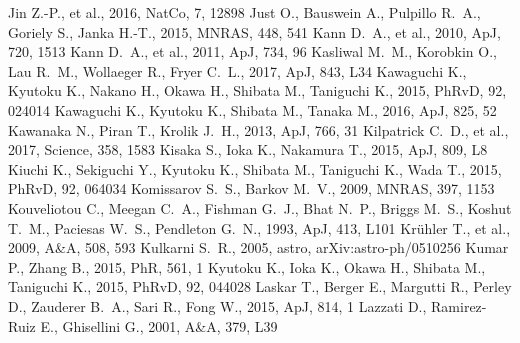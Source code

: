 \documentclass[a4paper,fleqn,usenatbib]{mnras}
\begin{document}
\begin{thebibliography}{207}
 Jin Z.-P., et al., 2016, NatCo, 7, 12898
 Just O., Bauswein A., Pulpillo R.~A., Goriely S., Janka H.-T., 2015, MNRAS, 448, 541
 Kann D.~A., et al., 2010, ApJ, 720, 1513
 Kann D.~A., et al., 2011, ApJ, 734, 96
 Kasliwal M.~M., Korobkin O., Lau R.~M., Wollaeger R., Fryer C.~L., 2017, ApJ, 843, L34
 Kawaguchi K., Kyutoku K., Nakano H., Okawa H., Shibata M., Taniguchi K., 2015, PhRvD, 92, 024014
 Kawaguchi K., Kyutoku K., Shibata M., Tanaka M., 2016, ApJ, 825, 52
 Kawanaka N., Piran T., Krolik J.~H., 2013, ApJ, 766, 31
 Kilpatrick C.~D., et al., 2017, Science, 358, 1583 
 Kisaka S., Ioka K., Nakamura T., 2015, ApJ, 809, L8
 Kiuchi K., Sekiguchi Y., Kyutoku K., Shibata M., Taniguchi K., Wada T., 2015, PhRvD, 92, 064034
 Komissarov S.~S., Barkov M.~V., 2009, MNRAS, 397, 1153
 Kouveliotou C., Meegan C.~A., Fishman G.~J., Bhat N.~P., Briggs M.~S., Koshut T.~M., Paciesas W.~S., Pendleton G.~N., 1993, ApJ, 413, L101
 Kr{\"u}hler T., et al., 2009, A\&A, 508, 593
 Kulkarni S.~R., 2005, astro, arXiv:astro-ph/0510256
 Kumar P., Zhang B., 2015, PhR, 561, 1
 Kyutoku K., Ioka K., Okawa H., Shibata M., Taniguchi K., 2015, PhRvD, 92, 044028
 Laskar T., Berger E., Margutti R., Perley D., Zauderer B.~A., Sari R., Fong W., 2015, ApJ, 814, 1
 Lazzati D., Ramirez-Ruiz E., Ghisellini G., 2001, A\&A, 379, L39

\end{thebibliography}
\end{document}
